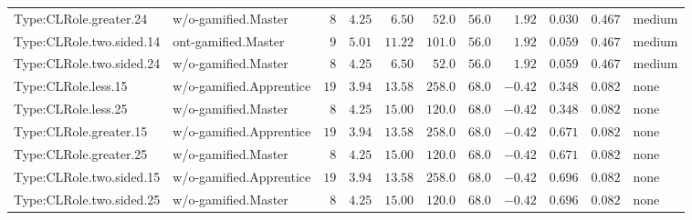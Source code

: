 \documentclass[6pt,a4paper]{article}
\begin{document}
{\begin{longtable}{llrrrrrrrrl}
Type:CLRole.greater.24&w/o-gamified.Master&$ 8$&$4.25$&$ 6.50$&$ 52.0$&$ 56.0$&$ 1.92$&$0.030$&$0.467$&medium\tabularnewline
Type:CLRole.two.sided.14&ont-gamified.Master&$ 9$&$5.01$&$11.22$&$101.0$&$ 56.0$&$ 1.92$&$0.059$&$0.467$&medium\tabularnewline
Type:CLRole.two.sided.24&w/o-gamified.Master&$ 8$&$4.25$&$ 6.50$&$ 52.0$&$ 56.0$&$ 1.92$&$0.059$&$0.467$&medium\tabularnewline
Type:CLRole.less.15&w/o-gamified.Apprentice&$19$&$3.94$&$13.58$&$258.0$&$ 68.0$&$-0.42$&$0.348$&$0.082$&none\tabularnewline
Type:CLRole.less.25&w/o-gamified.Master&$ 8$&$4.25$&$15.00$&$120.0$&$ 68.0$&$-0.42$&$0.348$&$0.082$&none\tabularnewline
Type:CLRole.greater.15&w/o-gamified.Apprentice&$19$&$3.94$&$13.58$&$258.0$&$ 68.0$&$-0.42$&$0.671$&$0.082$&none\tabularnewline
Type:CLRole.greater.25&w/o-gamified.Master&$ 8$&$4.25$&$15.00$&$120.0$&$ 68.0$&$-0.42$&$0.671$&$0.082$&none\tabularnewline
\newpage
Type:CLRole.two.sided.15&w/o-gamified.Apprentice&$19$&$3.94$&$13.58$&$258.0$&$ 68.0$&$-0.42$&$0.696$&$0.082$&none\tabularnewline
Type:CLRole.two.sided.25&w/o-gamified.Master&$ 8$&$4.25$&$15.00$&$120.0$&$ 68.0$&$-0.42$&$0.696$&$0.082$&none\tabularnewline
\hline
\end{longtable}}
\end{document}
